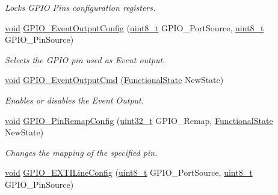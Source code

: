 \begin{DoxyCompactItemize}
\begin{DoxyCompactList}\small\item\em Locks G\+P\+IO Pins configuration registers. \end{DoxyCompactList}\item 
\hyperlink{usb__devapi_8h_afabf60e7f57651d6d595a02c75f07cd0}{void} \hyperlink{group___g_p_i_o___private___functions_ga935f31ed7a86c6cb594cf34313b4b7af}{G\+P\+I\+O\+\_\+\+Event\+Output\+Config} (\hyperlink{_p_e___types_8h_aba7bc1797add20fe3efdf37ced1182c5}{uint8\+\_\+t} G\+P\+I\+O\+\_\+\+Port\+Source, \hyperlink{_p_e___types_8h_aba7bc1797add20fe3efdf37ced1182c5}{uint8\+\_\+t} G\+P\+I\+O\+\_\+\+Pin\+Source)
\begin{DoxyCompactList}\small\item\em Selects the G\+P\+IO pin used as Event output. \end{DoxyCompactList}\item 
\hyperlink{usb__devapi_8h_afabf60e7f57651d6d595a02c75f07cd0}{void} \hyperlink{group___g_p_i_o___private___functions_gaf13ab3d59e467df44b492f1cdfe2f588}{G\+P\+I\+O\+\_\+\+Event\+Output\+Cmd} (\hyperlink{agilefox_2library_2inc_2stm32f10x__type_8h_ac9a7e9a35d2513ec15c3b537aaa4fba1}{Functional\+State} New\+State)
\begin{DoxyCompactList}\small\item\em Enables or disables the Event Output. \end{DoxyCompactList}\item 
\hyperlink{usb__devapi_8h_afabf60e7f57651d6d595a02c75f07cd0}{void} \hyperlink{group___g_p_i_o___private___functions_ga64eb76f6211b840daf9829289df4208b}{G\+P\+I\+O\+\_\+\+Pin\+Remap\+Config} (\hyperlink{_p_e___types_8h_a33594304e786b158f3fb30289278f5af}{uint32\+\_\+t} G\+P\+I\+O\+\_\+\+Remap, \hyperlink{agilefox_2library_2inc_2stm32f10x__type_8h_ac9a7e9a35d2513ec15c3b537aaa4fba1}{Functional\+State} New\+State)
\begin{DoxyCompactList}\small\item\em Changes the mapping of the specified pin. \end{DoxyCompactList}\item 
\hyperlink{usb__devapi_8h_afabf60e7f57651d6d595a02c75f07cd0}{void} \hyperlink{group___g_p_i_o___private___functions_ga8c1f13646d7418827378032a584da653}{G\+P\+I\+O\+\_\+\+E\+X\+T\+I\+Line\+Config} (\hyperlink{_p_e___types_8h_aba7bc1797add20fe3efdf37ced1182c5}{uint8\+\_\+t} G\+P\+I\+O\+\_\+\+Port\+Source, \hyperlink{_p_e___types_8h_aba7bc1797add20fe3efdf37ced1182c5}{uint8\+\_\+t} G\+P\+I\+O\+\_\+\+Pin\+Source)

\end{DoxyCompactItemize}
